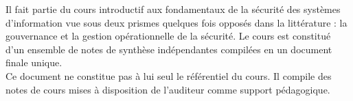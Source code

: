 

Il fait partie du cours introductif aux fondamentaux de la sécurité des systèmes d'information vue sous deux prismes quelques fois opposés dans la littérature : la gouvernance et la gestion opérationnelle de la sécurité.
Le cours est constitué d'un ensemble de notes de synthèse indépendantes compilées en un document finale unique.\\
Ce document ne constitue pas à lui seul le référentiel du cours. Il compile des notes de cours mises à disposition de l'auditeur comme support pédagogique.